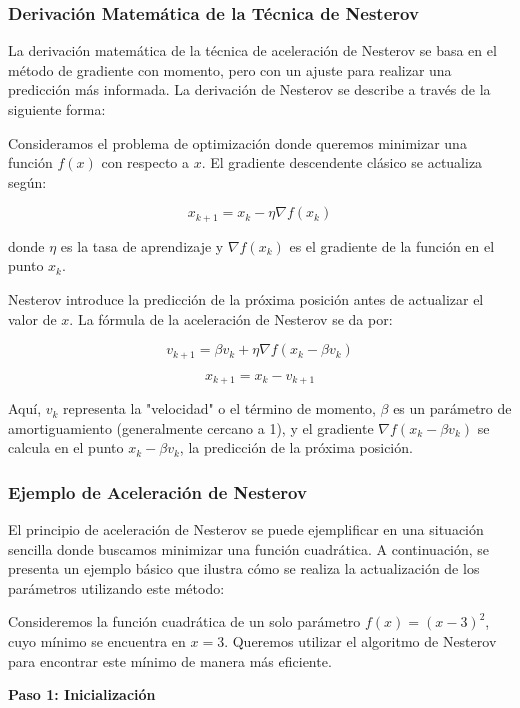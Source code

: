 \documentclass{article}
\begin{document}
	\subsubsection{Derivación Matemática de la Técnica de Nesterov}
	
	La derivación matemática de la técnica de aceleración de Nesterov se basa en el método de gradiente con momento, pero con un ajuste para realizar una predicción más informada. La derivación de Nesterov se describe a través de la siguiente forma:
	
	Consideramos el problema de optimización donde queremos minimizar una función \( f(x) \) con respecto a \( x \). El gradiente descendente clásico se actualiza según:
	
	\[
	x_{k+1} = x_k - \eta \nabla f(x_k)
	\]
	
	donde \( \eta \) es la tasa de aprendizaje y \( \nabla f(x_k) \) es el gradiente de la función en el punto \( x_k \).
	
	Nesterov introduce la predicción de la próxima posición antes de actualizar el valor de \( x \). La fórmula de la aceleración de Nesterov se da por:
	
	\[
	v_{k+1} = \beta v_k + \eta \nabla f(x_k - \beta v_k)
	\]
	
	\[
	x_{k+1} = x_k - v_{k+1}
	\]
	
	Aquí, \( v_k \) representa la "velocidad" o el término de momento, \( \beta \) es un parámetro de amortiguamiento (generalmente cercano a 1), y el gradiente \( \nabla f(x_k - \beta v_k) \) se calcula en el punto \( x_k - \beta v_k \), la predicción de la próxima posición.
	
	\subsubsection{Ejemplo de Aceleración de Nesterov}
	
	El principio de aceleración de Nesterov se puede ejemplificar en una situación sencilla donde buscamos minimizar una función cuadrática. A continuación, se presenta un ejemplo básico que ilustra cómo se realiza la actualización de los parámetros utilizando este método:
	
	Consideremos la función cuadrática de un solo parámetro \( f(x) = (x - 3)^2 \), cuyo mínimo se encuentra en \( x = 3 \). Queremos utilizar el algoritmo de Nesterov para encontrar este mínimo de manera más eficiente.
	
	\textbf{Paso 1: Inicialización}
	
\end{document}
